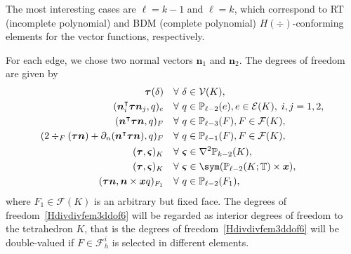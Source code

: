 The most interesting cases are $\ell=k-1$ and $\ell = k$, which correspond to RT (incomplete polynomial) and BDM (complete polynomial) $H(\div)$-conforming elements for the vector functions, respectively. 

For each edge, we chose two normal vectors $\boldsymbol n_1$ and $\boldsymbol n_2$. The degrees of freedom are given by
\begin{align}
\boldsymbol \tau (\delta) & \quad\forall~\delta\in \mathcal V(K), \label{Hdivdivfem3ddof1}\\
(\boldsymbol  n_i^{\intercal}\boldsymbol \tau\boldsymbol n_j, q)_e & \quad\forall~q\in\mathbb P_{\ell-2}(e),  e\in\mathcal E(K),\; i,j=1,2,\label{Hdivdivfem3ddof2}\\
(\boldsymbol  n^{\intercal}\boldsymbol \tau\boldsymbol  n, q)_F & \quad\forall~q\in\mathbb P_{\ell-3}(F),  F\in\mathcal F(K),\label{Hdivdivfem3ddof3}\\
(2\div_F(\boldsymbol\tau \boldsymbol n)+ \partial_n(\boldsymbol n^{\intercal} \boldsymbol \tau\boldsymbol n), q)_F & \quad\forall~q\in\mathbb P_{\ell-1}(F),  F\in\mathcal F(K),\label{Hdivdivfem3ddof4}\\
(\boldsymbol \tau, \boldsymbol \varsigma)_K & \quad\forall~\boldsymbol \varsigma\in\nabla^2\mathbb P_{k-2}(K), \label{Hdivdivfem3ddof5} \\
(\boldsymbol \tau, \boldsymbol \varsigma)_K & \quad\forall~\boldsymbol \varsigma\in \sym(\mathbb P_{\ell-2}(K; \mathbb T)\times\boldsymbol x), \label{Hdivdivfem3ddof55} \\
(\boldsymbol \tau\boldsymbol n, \boldsymbol  n\times \boldsymbol x q)_{F_1} & \quad\forall~q\in\mathbb P_{\ell-2}(F_1),\label{Hdivdivfem3ddof6}
\end{align}
where $F_1\in\mathcal F(K)$ is an arbitrary but fixed face. The degrees of freedom~\eqref{Hdivdivfem3ddof6} will be regarded as interior degrees of freedom to the tetrahedron $K$, that is the degrees of freedom~\eqref{Hdivdivfem3ddof6} will be double-valued if $F\in\mathcal F_h^i$ is selected in different elements. 

